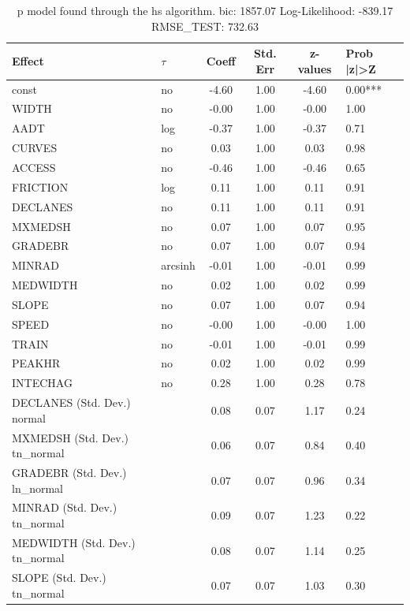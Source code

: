 \begin{table}
	\caption{p model found through the hs algorithm. bic: 1857.07 Log-Likelihood: -839.17 RMSE_TEST: 732.63}
	\begin{center}
		\begin{tabular}{|l|l|c|c|c|l|}
			\hline
			Effect & $\tau$ & Coeff & Std. Err & z-values & Prob |z|>Z \\
			\hline
			const & no & -4.60 & 1.00 & -4.60 & 0.00*** \\
			\hline
			WIDTH & no & -0.00 & 1.00 & -0.00 & 1.00 \\
			\hline
			AADT & log & -0.37 & 1.00 & -0.37 & 0.71 \\
			\hline
			CURVES & no & 0.03 & 1.00 & 0.03 & 0.98 \\
			\hline
			ACCESS & no & -0.46 & 1.00 & -0.46 & 0.65 \\
			\hline
			FRICTION & log & 0.11 & 1.00 & 0.11 & 0.91 \\
			\hline
			DECLANES & no & 0.11 & 1.00 & 0.11 & 0.91 \\
			\hline
			MXMEDSH & no & 0.07 & 1.00 & 0.07 & 0.95 \\
			\hline
			GRADEBR & no & 0.07 & 1.00 & 0.07 & 0.94 \\
			\hline
			MINRAD & arcsinh & -0.01 & 1.00 & -0.01 & 0.99 \\
			\hline
			MEDWIDTH & no & 0.02 & 1.00 & 0.02 & 0.99 \\
			\hline
			SLOPE & no & 0.07 & 1.00 & 0.07 & 0.94 \\
			\hline
			SPEED & no & -0.00 & 1.00 & -0.00 & 1.00 \\
			\hline
			TRAIN & no & -0.01 & 1.00 & -0.01 & 0.99 \\
			\hline
			PEAKHR & no & 0.02 & 1.00 & 0.02 & 0.99 \\
			\hline
			INTECHAG & no & 0.28 & 1.00 & 0.28 & 0.78 \\
			\hline
			DECLANES (Std. Dev.) normal &  & 0.08 & 0.07 & 1.17 & 0.24 \\
			\hline
			MXMEDSH (Std. Dev.) tn_normal &  & 0.06 & 0.07 & 0.84 & 0.40 \\
			\hline
			GRADEBR (Std. Dev.) ln_normal &  & 0.07 & 0.07 & 0.96 & 0.34 \\
			\hline
			MINRAD (Std. Dev.) tn_normal &  & 0.09 & 0.07 & 1.23 & 0.22 \\
			\hline
			MEDWIDTH (Std. Dev.) tn_normal &  & 0.08 & 0.07 & 1.14 & 0.25 \\
			\hline
			SLOPE (Std. Dev.) tn_normal &  & 0.07 & 0.07 & 1.03 & 0.30 \\

\end{tabular}
\end{center}
\end{table}
